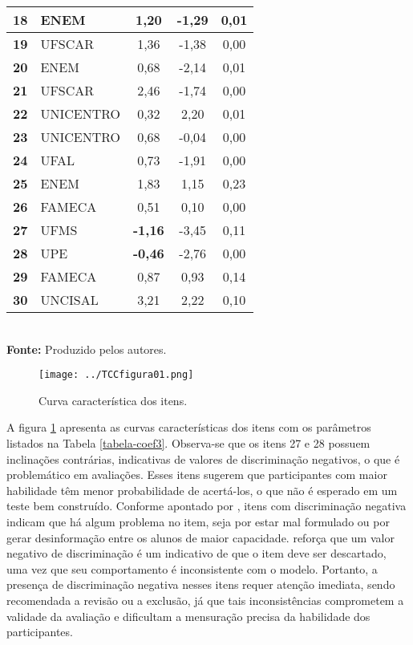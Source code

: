 \begin{table}[!htb]
\begin{tabular*}{.9\textwidth}{@{\extracolsep{\fill}}clccc@{}}
		\hline \textbf{18} & ENEM & 1,20 & -1,29 & 0,01 \\ 
		\hline \textbf{19} & UFSCAR & 1,36 & -1,38 & 0,00 \\ 
		\hline \textbf{20} & ENEM & 0,68 & -2,14 & 0,01 \\ 
		\hline \textbf{21} & UFSCAR & 2,46 & -1,74 & 0,00  \\ 
		\hline \textbf{22} & UNICENTRO & 0,32 & 2,20 & 0,01 \\ 
		\hline \textbf{23} & UNICENTRO & 0,68 & -0,04 & 0,00  \\ 
		\hline \textbf{24} & UFAL & 0,73 & -1,91 & 0,00 \\ 
		\hline \textbf{25} & ENEM & 1,83 & 1,15 & 0,23  \\ 
		\hline \textbf{26} & FAMECA & 0,51 & 0,10 & 0,00 \\ 
		\hline \textbf{27} & UFMS & \textbf{-1,16} & -3,45 & 0,11  \\ 
		\hline \textbf{28} & UPE & \textbf{-0,46} & -2,76 & 0,00  \\ 
		\hline \textbf{29} & FAMECA & 0,87 & 0,93 & 0,14  \\ 
		\hline \textbf{30} & UNCISAL & 3,21 & 2,22 & 0,10 \\ 
			\bottomrule
		\end{tabular*}\\
		\vspace*{0.5cm}
		\small{\textbf{Fonte:} Produzido pelos autores.}
\end{table}
\clearpage
\begin{figure}[H]
	\centering
	\caption{Curva característica dos itens.}
	\texttt{[image: ../TCCfigura01.png]}
	\parbox{\textwidth}{
		\centering %
	}
	\label{fig:curva_itens}
\end{figure}

A figura \ref{fig:curva_itens} apresenta as curvas características dos itens com os parâmetros listados na Tabela \ref{tabela-coef3}. Observa-se que os itens 27 e 28 possuem inclinações contrárias, indicativas de valores de discriminação negativos, o que é problemático em avaliações. Esses itens sugerem que participantes com maior habilidade têm menor probabilidade de acertá-los, o que não é esperado em um teste bem construído. Conforme apontado por , itens com discriminação negativa indicam que há algum problema no item, seja por estar mal formulado ou por gerar desinformação entre os alunos de maior capacidade.  reforça que um valor negativo de discriminação é um indicativo de que o item deve ser descartado, uma vez que seu comportamento é inconsistente com o modelo. Portanto, a presença de discriminação negativa nesses itens requer atenção imediata, sendo recomendada a revisão ou a exclusão, já que tais inconsistências comprometem a validade da avaliação e dificultam a mensuração precisa da habilidade dos participantes.

